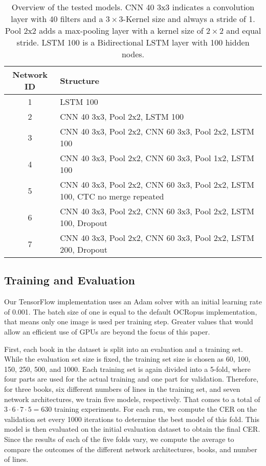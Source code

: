 \documentclass{jlcl}
\begin{document}
\begin{table}[t]
    \centering
    \caption{Overview of the tested models. CNN 40 3x3 indicates a convolution layer with 40 filters and a $3\times3$-Kernel size and always a stride of 1. Pool 2x2 adds a max-pooling layer with a kernel size of $2\times2$ and equal stride. LSTM 100 is a Bidirectional LSTM layer with 100 hidden nodes.}
    \label{tab:networks}
    \begin{tabularx}{\textwidth}{cX}
        \hline
        \textbf{Network ID} & \textbf{Structure} \\
        \hline
        1 & LSTM 100 \\
        2 & CNN 40 3x3, Pool 2x2, LSTM 100 \\
        3 & CNN 40 3x3, Pool 2x2, CNN 60 3x3, Pool 2x2, LSTM 100 \\
        4 & CNN 40 3x3, Pool 2x2, CNN 60 3x3, Pool 1x2, LSTM 100 \\
        5 & CNN 40 3x3, Pool 2x2, CNN 60 3x3, Pool 2x2, LSTM 100, CTC no merge repeated \\
        6 & CNN 40 3x3, Pool 2x2, CNN 60 3x3, Pool 2x2, LSTM 100, Dropout \\
        7 & CNN 40 3x3, Pool 2x2, CNN 60 3x3, Pool 2x2, LSTM 200, Dropout \\
        \hline
    \end{tabularx}
\end{table}

\subsection{Training and Evaluation}
Our TensorFlow implementation uses an Adam solver with an initial learning rate of 0.001.
The batch size of one is equal to the default OCRopus implementation, that means only one image is used per training step.
Greater values that would allow an efficient use of GPUs are beyond the focus of this paper.

First, each book in the dataset is split into an evaluation and a training set.
While the evaluation set size is fixed, the training set size is chosen as 60, 100, 150, 250, 500, and 1000.
Each training set is again divided into a 5-fold, where four parts are used for the actual training and one part for validation.
Therefore, for three books, six different numbers of lines in the training set, and seven network architectures, we train five models, respectively.
That comes to a total of $3 \cdot 6 \cdot 7 \cdot 5 = 630$ training experiments.
For each run, we compute the CER on the validation set every 1000 iterations to determine the best model of this fold.
This model is then evaluated on the initial evaluation dataset to obtain the final CER.
Since the results of each of the five folds vary, we compute the average to compare the outcomes of the different network architectures, books, and number of lines.
\end{document}
